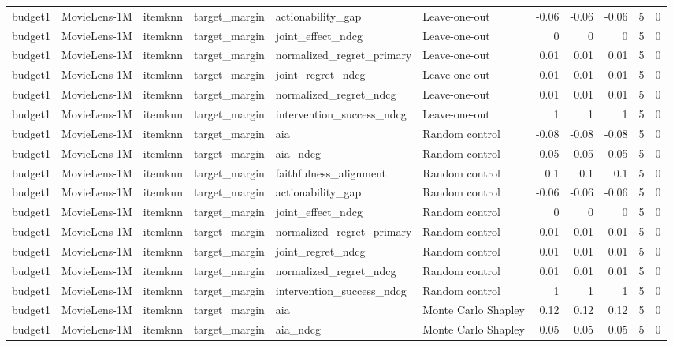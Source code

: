 \begin{table}[t]
{\begin{tabular}{llllllrrrrr}
budget1 & MovieLens-1M & itemknn & target\_margin & actionability\_gap & Leave-one-out & -0.06 & -0.06 & -0.06 & 5 & 0 \\
budget1 & MovieLens-1M & itemknn & target\_margin & joint\_effect\_ndcg & Leave-one-out & 0 & 0 & 0 & 5 & 0 \\
budget1 & MovieLens-1M & itemknn & target\_margin & normalized\_regret\_primary & Leave-one-out & 0.01 & 0.01 & 0.01 & 5 & 0 \\
budget1 & MovieLens-1M & itemknn & target\_margin & joint\_regret\_ndcg & Leave-one-out & 0.01 & 0.01 & 0.01 & 5 & 0 \\
budget1 & MovieLens-1M & itemknn & target\_margin & normalized\_regret\_ndcg & Leave-one-out & 0.01 & 0.01 & 0.01 & 5 & 0 \\
budget1 & MovieLens-1M & itemknn & target\_margin & intervention\_success\_ndcg & Leave-one-out & 1 & 1 & 1 & 5 & 0 \\
budget1 & MovieLens-1M & itemknn & target\_margin & aia & Random control & -0.08 & -0.08 & -0.08 & 5 & 0 \\
budget1 & MovieLens-1M & itemknn & target\_margin & aia\_ndcg & Random control & 0.05 & 0.05 & 0.05 & 5 & 0 \\
budget1 & MovieLens-1M & itemknn & target\_margin & faithfulness\_alignment & Random control & 0.1 & 0.1 & 0.1 & 5 & 0 \\
budget1 & MovieLens-1M & itemknn & target\_margin & actionability\_gap & Random control & -0.06 & -0.06 & -0.06 & 5 & 0 \\
budget1 & MovieLens-1M & itemknn & target\_margin & joint\_effect\_ndcg & Random control & 0 & 0 & 0 & 5 & 0 \\
budget1 & MovieLens-1M & itemknn & target\_margin & normalized\_regret\_primary & Random control & 0.01 & 0.01 & 0.01 & 5 & 0 \\
budget1 & MovieLens-1M & itemknn & target\_margin & joint\_regret\_ndcg & Random control & 0.01 & 0.01 & 0.01 & 5 & 0 \\
budget1 & MovieLens-1M & itemknn & target\_margin & normalized\_regret\_ndcg & Random control & 0.01 & 0.01 & 0.01 & 5 & 0 \\
budget1 & MovieLens-1M & itemknn & target\_margin & intervention\_success\_ndcg & Random control & 1 & 1 & 1 & 5 & 0 \\
budget1 & MovieLens-1M & itemknn & target\_margin & aia & Monte Carlo Shapley & 0.12 & 0.12 & 0.12 & 5 & 0 \\
budget1 & MovieLens-1M & itemknn & target\_margin & aia\_ndcg & Monte Carlo Shapley & 0.05 & 0.05 & 0.05 & 5 & 0 \\

\end{tabular}}
\end{table}
